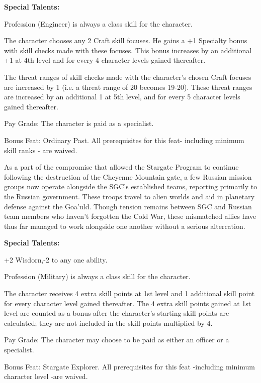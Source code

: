 \textbf{Special Talents:}
\begin{itemize*}
\item Profession (Engineer) is always a class skill for the character.
\item The character chooses any 2 Craft skill focuses. He gains a +1 Specialty bonus with skill checks made with these focuses. This bonus increases by an additional +1 at 4th level and for every 4 character levels gained thereafter.
\item The threat ranges of skill checks made with the character's chosen Craft focuses are increased by 1 (i.e. a threat range of 20 becomes 19-20). These threat ranges are increased by an additional 1 at 5th level, and for every 5 character levels gained thereafter.
\item Pay Grade: The character is paid as a specialist.
\item Bonus Feat: Ordinary Past. All prerequisites for this feat- including minimum skill ranks - are waived.
\end{itemize*}

As a part of the compromise that allowed the Stargate Program to continue following the destruction of the Cheyenne Mountain gate, a few Russian mission groups now operate alongside the SGC's established teams, reporting primarily to the Russian government. These troops travel to alien worlds and aid in planetary defense against the Goa'uld. Though tension remains between SGC and Russian team members who haven't forgotten the Cold War, these mismatched allies have thus far managed to work alongside one another without a serious altercation.

\textbf{Special Talents:}
\begin{itemize*}
\item +2 Wisdorn,-2 to any one ability.
\item Profession (Military) is always a class skill for the character.
\item The character receives 4 extra skill points at 1st level and 1 additional skill point for every character level gained thereafter. The 4 extra skill points gained at 1st level are counted as a bonus after the character's starting skill points are calculated; they are not included in the skill points multiplied by 4.
\item Pay Grade: The character may choose to be paid as either an officer or a specialist.
\item Bonus Feat: Stargate Explorer. All prerequisites for this feat -including minimum character level -are waived.
\end{itemize*}


%
%
%
%
%
%
